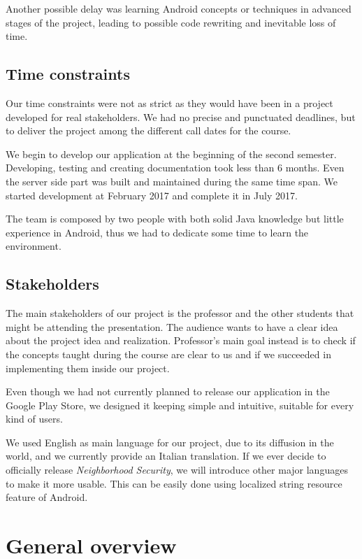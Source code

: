 \documentclass[a4paper]{scrreprt}
\begin{document}
Another possible delay was learning Android concepts or techniques in advanced stages of the project, leading to possible code rewriting and inevitable loss of time.

\section{Time constraints}
Our time constraints were not as strict as they would have been in a project developed for real stakeholders. We had no precise and punctuated deadlines, but to deliver the project among the different call dates for the course.

\bigskip We begin to develop our application at the beginning of the second semester. Developing, testing and creating documentation took less than 6 months. Even the server side part was built and maintained during the same time span. We started development at February 2017 and complete it in July 2017.

\bigskip The team is composed by two people with both solid Java knowledge but little experience in Android, thus we had to dedicate some time to learn the environment.

\section{Stakeholders}
The main stakeholders of our project is the professor and the other students that might be attending the presentation. The audience wants to have a clear idea about the project idea and realization. Professor's main goal instead is to check if the concepts taught during the course are clear to us and if we succeeded in implementing them inside our project.

\bigskip Even though we had not currently planned to release our application in the Google Play Store, we designed it keeping simple and intuitive, suitable for every kind of users.

We used English as main language for our project, due to its diffusion in the world, and we currently provide an Italian translation. If we ever decide to officially release \emph{Neighborhood Security}, we will introduce other major languages to make it more usable. This can be easily done using localized string resource feature of Android.

\chapter{General overview}
\end{document}
